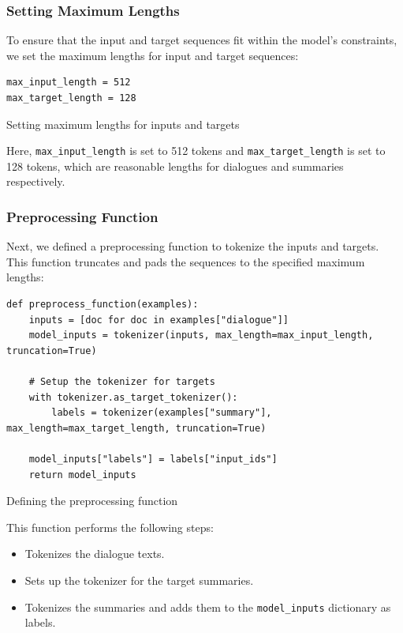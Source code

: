 \subsubsection{Setting Maximum Lengths}

To ensure that the input and target sequences fit within the model's constraints, we set the maximum lengths for input and target sequences:

\begin{listing}[H]
\begin{verbatim}
max_input_length = 512
max_target_length = 128
\end{verbatim}
\caption{Setting maximum lengths for inputs and targets}
\label{listing:Max_Lengths}
\end{listing}

Here, \texttt{max\_input\_length} is set to 512 tokens and \texttt{max\_target\_length} is set to 128 tokens, which are reasonable lengths for dialogues and summaries respectively.

\subsubsection{Preprocessing Function}

Next, we defined a preprocessing function to tokenize the inputs and targets. This function truncates and pads the sequences to the specified maximum lengths:

\begin{listing}[H]
\begin{verbatim}
def preprocess_function(examples):
    inputs = [doc for doc in examples["dialogue"]]
    model_inputs = tokenizer(inputs, max_length=max_input_length, truncation=True)

    # Setup the tokenizer for targets
    with tokenizer.as_target_tokenizer():
        labels = tokenizer(examples["summary"], max_length=max_target_length, truncation=True)

    model_inputs["labels"] = labels["input_ids"]
    return model_inputs
\end{verbatim}
\caption{Defining the preprocessing function}
\label{listing:Preprocess_Function}
\end{listing}

This function performs the following steps:
\begin{itemize}
    \item Tokenizes the dialogue texts.
    \item Sets up the tokenizer for the target summaries.
    \item Tokenizes the summaries and adds them to the \texttt{model\_inputs} dictionary as labels.
\end{itemize}


